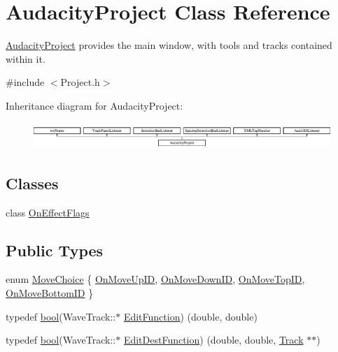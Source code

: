 \hypertarget{class_audacity_project}{}\section{Audacity\+Project Class Reference}
\label{class_audacity_project}


\hyperlink{class_audacity_project}{Audacity\+Project} provides the main window, with tools and tracks contained within it.  




{\ttfamily \#include $<$Project.\+h$>$}

Inheritance diagram for Audacity\+Project\+:\begin{figure}[H]
\begin{center}
\leavevmode
\includegraphics[height=1.014493cm]{class_audacity_project}
\end{center}
\end{figure}
\subsection*{Classes}
\begin{DoxyCompactItemize}
\item 
class \hyperlink{class_audacity_project_1_1_on_effect_flags}{On\+Effect\+Flags}
\end{DoxyCompactItemize}
\subsection*{Public Types}
\begin{DoxyCompactItemize}
\item 
enum \hyperlink{class_audacity_project_a2841977e2deccb4ffbc0da8d5e538d08}{Move\+Choice} \{ \hyperlink{class_audacity_project_a2841977e2deccb4ffbc0da8d5e538d08a36ad3fd96ec1e240b45ca36152f5bdfd}{On\+Move\+Up\+ID}, 
\hyperlink{class_audacity_project_a2841977e2deccb4ffbc0da8d5e538d08a5be74cecd58c62c581ebf67d39d5afcc}{On\+Move\+Down\+ID}, 
\hyperlink{class_audacity_project_a2841977e2deccb4ffbc0da8d5e538d08ad07891562eec17ba3f084fbee5e398b1}{On\+Move\+Top\+ID}, 
\hyperlink{class_audacity_project_a2841977e2deccb4ffbc0da8d5e538d08a96f029020ab1ca5433dc91dde392cba8}{On\+Move\+Bottom\+ID}
 \}
\item 
typedef \hyperlink{mac_2config_2i386_2lib-src_2libsoxr_2soxr-config_8h_abb452686968e48b67397da5f97445f5b}{bool}(Wave\+Track\+::$\ast$ \hyperlink{class_audacity_project_a839fd1fb973fd78cdc01bd13d5b72106}{Edit\+Function}) (double, double)
\item 
typedef \hyperlink{mac_2config_2i386_2lib-src_2libsoxr_2soxr-config_8h_abb452686968e48b67397da5f97445f5b}{bool}(Wave\+Track\+::$\ast$ \hyperlink{class_audacity_project_aeae383dd831845935d1444a09e3fddfb}{Edit\+Dest\+Function}) (double, double, \hyperlink{class_track}{Track} $\ast$$\ast$)
\end{DoxyCompactItemize}
